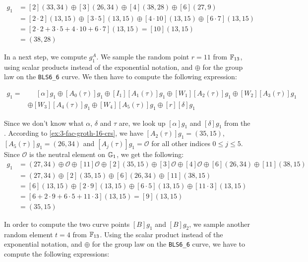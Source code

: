 \begin{example}
\begin{align*}
[W]g_1 & = [2](33,34)\oplus [3](26,34)\oplus [4](38,28)\oplus [6](27,9) \\
      & = [2\cdot 2](13,15)\oplus [3\cdot 5](13,15)\oplus [4\cdot 10](13,15)\oplus [6\cdot 7](13,15) \\        
      & = [2\cdot 2+ 3\cdot 5+4\cdot 10+ 6\cdot 7](13,15) = [10](13,15)\\
      & = (38,28)
\end{align*} 

In a next step, we compute $g_1^A$. We sample the random point $r=11$ from $\mathbb{F}_{13}$, using scalar products instead of the exponential notation, and $\oplus$ for the group law on the \texttt{BLS6\_6} curve. We then have to compute the following expression:

\begin{align*}
[A]g_1 = &\phantom{\oplus} [\alpha]g_1 \oplus [A_0(\tau)]g_1 \oplus [I_1][A_1(\tau)]g_1\oplus [W_1][A_2(\tau)]g_1 \oplus [W_2][A_3(\tau)]g_1\\ 
       & \oplus [W_3][A_4(\tau)]g_1\oplus [W_4][A_5(\tau)]g_1\oplus [r][\delta]g_1
\end{align*}

Since we don't know what $\alpha$, $\delta$ and $\tau$ are, we look up $[\alpha]g_1$ and $[\delta]g_1$ from the . According to \examplename{} \ref{ex:3-fac-groth-16-crs}, we have $[A_2(\tau)]g_1=(35,15)$, $[A_5(\tau)]g_1=(26,34)$ and $[A_j(\tau)]g_1=\mathcal{O}$ for all other indices $0\leq j\leq 5$. Since $\mathcal{O}$ is the neutral element on $\mathbb{G}_1$, we get the following:
\begin{align*}
[A]g_1 &= (27,34) \oplus \mathcal{O} \oplus [11]\mathcal{O}\oplus [2](35,15) \oplus [3]\mathcal{O} \oplus [4]\mathcal{O}\oplus [6](26,34)\oplus [11](38,15)\\
 &=  (27,34)\oplus [2](35,15)\oplus [6](26,34)\oplus [11](38,15)\\
 &=  [6](13,15)\oplus [2\cdot 9](13,15)\oplus [6\cdot 5](13,15)\oplus [11\cdot 3](13,15)\\ 
 &=  [6+ 2\cdot 9+ 6\cdot 5+ 11\cdot 3](13,15) = [9](13,15)\\
 &= (35,15)
\end{align*}

In order to compute the two curve points $[B]g_1$ and $[B]g_2$, we sample another random element $t=4$ from $\mathbb{F}_{13}$. Using the scalar product instead of the exponential notation, and $\oplus$ for the group law on the \texttt{BLS6\_6} curve, we  have to compute the following expressions:


\end{example}
